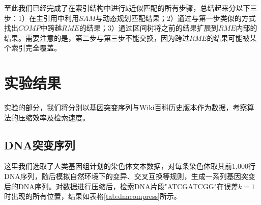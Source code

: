 ﻿\documentclass{sysuthesis}
\begin{document}
至此我们已经完成了在索引结构中进行k近似匹配的所有步骤，总结起来分以下三步：1）在主引用中利用$SAM$与动态规划匹配结果；2）通过与第一步类似的方式找出$COMP$中跨越$RME$的结果；3）通过区间树将之前的结果扩展到$RME$内部的结果。需要注意的是，第二步与第三步不能交换，因为跨过$RME$的结果可能被某个索引完全覆盖。



\chapter{实验结果}
实验的部分，我们将分别以基因突变序列与Wiki百科历史版本作为数据，考察算法的压缩效率及检索速度。



\section{DNA突变序列}
这里我们选取了人类基因组计划的染色体文本数据，对每条染色体取其前1,000行DNA序列，随后模拟自然环境下的变异、交叉互换等规则，生成一系列基因突变后的DNA序列。对数据进行压缩后，检索DNA片段"ATCGATCGG"在误差$k = 1$时出现的所有位置，结果如表格\ref{tab:dnacompress}所示。\par
\end{document}
